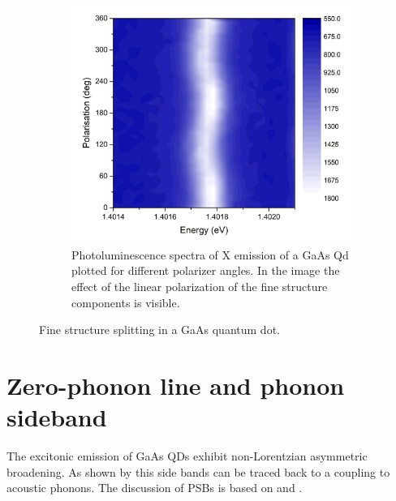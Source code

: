 \begin{figure}[H]
	\begin{subfigure}[b]{0.48\textwidth}
		\centering
		\includegraphics[width=1.05\textwidth]{figures/quantum-dot/FSS_Pol.png}
		\caption{Photoluminescence spectra of X emission of a GaAs Qd plotted for different polarizer angles.
		In the image the effect of the linear polarization of the fine structure components is visible.~\cite{schimpf_towards_2017}}
		\label{fig:fss-pol}
	\end{subfigure}
	\caption{Fine structure splitting in a GaAs quantum dot.}
	\label{fig:fss}
\end{figure}


\newpage
\section{Zero-phonon line and phonon sideband}
The excitonic emission of \ac{GaAs} \acp{QD} exhibit non-Lorentzian asymmetric broadening. As shown by \textcite{peter_phonon_2004} this side bands can be traced back to a coupling to acoustic phonons.
The discussion of \acp{PSB} is based on \textcite{friedrich_photochemical_1984} and  \textcite{peter_phonon_2004}.

